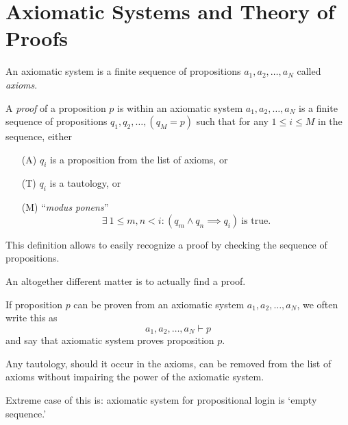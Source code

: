 \section{Axiomatic Systems and Theory of Proofs}

\begin{definition}
	An axiomatic system is a finite sequence of propositions \(a_1, a_2, \ldots, a_N\) called \emph{axioms}.
\end{definition}

\begin{definition}[Proof]
	A \emph{proof} of a proposition \(p\) is within an axiomatic system \(a_1, a_2, \ldots, a_N\) is a finite sequence of propositions \(q_1, q_2, \ldots, (q_M = p)\) such that for any \(1 \le i \le M\) in the sequence, either
	\begin{enumerate}[(A)]
		\item[(A)] \(q_i\) is a proposition from the list of axioms, or
		\item[(T)] \(q_i\) is a tautology, or
		\item[(M)] ``\textit{modus ponens}''
		      \begin{equation*}
			      \exists\ 1 \le m, n < i: (q_m \land q_n \implies q_i)\ \text{is true}.
		      \end{equation*}
	\end{enumerate}
\end{definition}
This definition allows to easily recognize a proof by checking the sequence of propositions.

\noindent An altogether different matter is to actually find a proof.

\begin{remark}
	If proposition \(p\) can be proven from an axiomatic system \(a_1, a_2, \ldots, a_N\), we often write this as
	\begin{equation*}
		a_1, a_2, \ldots, a_N \vdash p
	\end{equation*}
	and say that axiomatic system proves proposition \(p\).
\end{remark}

\begin{remark}
	Any tautology, should it occur in the axioms, can be removed from the list of axioms without impairing the power of the axiomatic system.
\end{remark}
Extreme case of this is: axiomatic system for propositional login is `empty sequence.'

